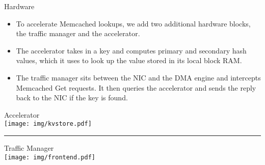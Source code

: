 \begin{block}{Hardware}

\begin{multicols}{2}
\begin{itemize}
\footnotesize
    \item To accelerate Memcached lookups, we add two additional hardware
        blocks, the traffic manager and the accelerator.
    \item The accelerator takes in a key and computes primary and secondary
        hash values, which it uses to look up the value stored in its local
        block RAM.

    \item The traffic manager sits between the NIC and the DMA engine and
        intercepts Memcached Get requests. It then queries the accelerator
        and sends the reply back to the NIC if the key is found.
\end{itemize}

\columnbreak
\begin{center}
    \footnotesize Accelerator \\[0.5\baselineskip]
    \texttt{[image: img/kvstore.pdf]}
\end{center}
\hrule
\begin{center}
    \footnotesize Traffic Manager \\[0.5\baselineskip]
    \texttt{[image: img/frontend.pdf]}
\end{center}

\end{multicols}

\end{block}
